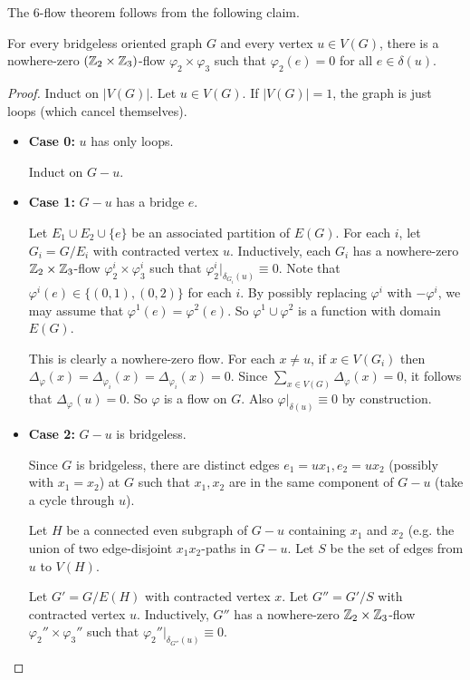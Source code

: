 \documentclass[main.tex]{subfiles}
\begin{document}
The 6-flow theorem follows from the following claim.
\begin{claim}
  For every bridgeless oriented graph $G$ and every vertex $u\in V(G)$,
  there is a nowhere-zero $(\mathbb Z_2\times\mathbb Z_3)$-flow $\varphi_2\times\varphi_3$
  such that $\varphi_2(e) = 0$ for all $e\in\delta(u)$.
\end{claim}
\begin{proof} %
  Induct on $|V(G)|$.
  Let $u\in V(G)$.
  If $|V(G)| = 1$, the graph is just loops (which cancel themselves).
  \begin{itemize}
    \item \textbf{Case 0:} $u$ has only loops.

      Induct on $G - u$.

    \item \textbf{Case 1:} $G - u$ has a bridge $e$.

      Let $E_1\cup E_2\cup\{e\}$ be an associated partition of $E(G)$.
      For each $i$, let $G_i = G/E_i$ with contracted vertex $u$.
      Inductively, each $G_i$ has a nowhere-zero $\mathbb Z_2\times\mathbb Z_3$-flow
      $\varphi^i_2\times\varphi^i_3$ such that
      $\varphi_2^i|_{\delta_{G_i}(u)}\equiv 0$.
      Note that $\varphi^i(e)\in\{(0,1),(0,2)\}$ for each $i$.
      By possibly replacing $\varphi^i$ with $-\varphi^i$, we may assume that
      $\varphi^1(e) = \varphi^2(e)$.
      So $\varphi^1\cup\varphi^2$ is a function with domain $E(G)$.

      This is clearly a nowhere-zero flow.
      For each $x\neq u$, if $x\in V(G_i)$ then
      $\Delta_\varphi(x) = \Delta_{\varphi_i}(x) = \Delta_{\varphi_i}(x) = 0$.
      Since $\sum_{x\in V(G)}\Delta_\varphi(x) = 0$, it follows that
      $\Delta_{\varphi}(u) = 0$.
      So $\varphi$ is a flow on $G$.
      Also $\varphi|_{\delta(u)}\equiv 0$ by construction.

    \item \textbf{Case 2:} $G - u$ is bridgeless.

      Since $G$ is bridgeless, there are distinct edges $e_1 = ux_1, e_2 = ux_2$
      (possibly with $x_1 = x_2$) at $G$ such that $x_1,x_2$ are in the same
      component of $G - u$ (take a cycle through $u$).

      Let $H$ be a connected even subgraph of $G - u$ containing $x_1$ and $x_2$
      (e.g. the union of two edge-disjoint $x_1x_2$-paths in $G - u$.
      Let $S$ be the set of edges from $u$ to $V(H)$.

      Let $G' = G/E(H)$ with contracted vertex $x$.
      Let $G'' = G'/S$ with contracted vertex $u$.
      Inductively, $G''$ has a nowhere-zero $\mathbb Z_2\times\mathbb Z_3$-flow
      $\varphi_2''\times\varphi_3''$ such that
      $\varphi_2''|_{\delta_{G''}(u)}\equiv 0$.


\end{itemize}
\end{proof}
\end{document}

